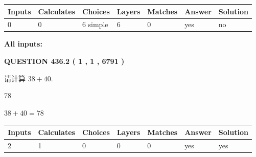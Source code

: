 \documentclass{ctexart}
\begin{document}
   
\noindent\begin{tabular}{|l|l|l|l|l|l|l|}
 \hline
Inputs & Calculates & Choices & Layers & Matches & Answer & Solution \\ \hline
 0  & 
 0  & 
 6
  simple  
  & 
 6  & 
 0  & 
  yes & 
  no 
  \\ \hline
 \end{tabular}
   
   
   
   
\noindent{}
   
   
   
   
\noindent\vspace{0.1in}\hspace{-0.08in} {\textbf{\Large{All inputs: }}}
   
   
  
\vspace{0.2in}
  
{\textbf{\Large{QUESTION
436.2 
 ( 1 , 1 , 6791 )
}}}
  
  
 
请计算 $ %
38 +  %
40 $.
 
 
 
\noindent{}
 
 

78
 
 
\noindent{}
 
 

 
 
 
\noindent{}
 
 

$ %
38 +  %
40=   %
78$
 
 
\noindent{}
 
 

 
   
   
   
   
\noindent\begin{tabular}{|l|l|l|l|l|l|l|}
 \hline
Inputs & Calculates & Choices & Layers & Matches & Answer & Solution \\ \hline
 2  & 
 1  & 
 0
  & 
 0  & 
 0  & 
  yes & 
  yes 
  \\ \hline
 \end{tabular}
   
\end{document}
